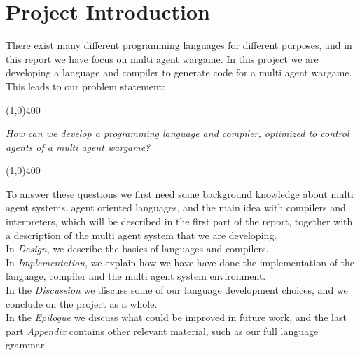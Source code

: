 \chapter*{Project Introduction}

There exist many different programming languages for different purposes, and in this report we have focus on multi agent wargame. In this project we are developing a language and compiler to generate code for a multi agent wargame. This leads to our problem statement:
\begin{center}
\line(1,0){400}
\end{center}
	\textit{How can we develop a programming language and compiler, optimized to control agents of a multi agent wargame?}
\begin{center}
\line(1,0){400}
\end{center}
To answer these questions we first need some background knowledge about multi agent systems, agent oriented languages, and the main idea with compilers and interpreters, which will be described in the first part of the report, together with a description of the multi agent system that we are developing.\\ \indent
In \textit{Design}, we describe the basics of languages and compilers.\\ \indent
In \textit{Implementation}, we explain how we have have done the implementation of the language, compiler and the multi agent system environment.\\ \indent
In the \textit{Discussion} we discuss some of our language development choices, and we conclude on the project as a whole.\\ \indent
In the \textit{Epilogue} we discuss what could be improved in future work, and the last part \textit{Appendix} contains other relevant material, such as our full language grammar.